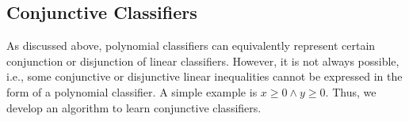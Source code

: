 %



\subsection{Conjunctive Classifiers}
As discussed above, polynomial classifiers can equivalently represent certain conjunction or disjunction of linear classifiers.
However, it is not always possible, i.e., some conjunctive or disjunctive linear inequalities cannot be expressed in the form of a polynomial classifier.
A simple example is $\mathit{x \ge 0 \land y \ge 0}$.
Thus, we develop an algorithm to learn conjunctive classifiers.

